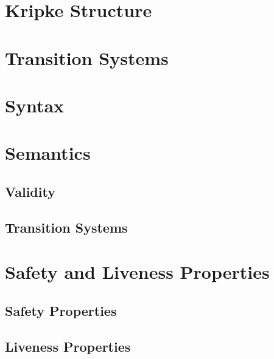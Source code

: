 \documentclass[a4paper, 11pt, accentcolor = tud3b]{tudreport}
\begin{document}
        \section{Kripke Structure} %

        \section{Transition Systems} %

        \section{Syntax} %

        \section{Semantics} %

            \subsection{Validity} %

            \subsection{Transition Systems} %

        \section{Safety and Liveness Properties} %

            \subsection{Safety Properties} %

            \subsection{Liveness Properties} %
\end{document}
